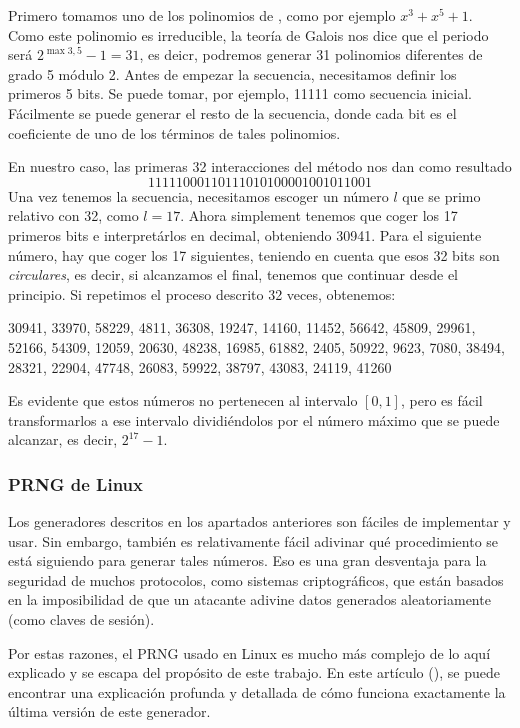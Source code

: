 \begin{example}\label{example:lfsrg}
Primero tomamos uno de los polinomios de \cite{zierler1969}, como por ejemplo $x^3+x^5+1$. Como este polinomio es irreducible, la teoría de Galois nos dice que el periodo será $2^{\max3,5}-1=31$, es deicr, podremos generar 31 polinomios diferentes de grado 5 módulo 2. Antes de empezar la secuencia, necesitamos definir los primeros 5 bits. Se puede tomar, por ejemplo, 11111 como secuencia inicial. Fácilmente se puede generar el resto de la secuencia, donde cada bit es el coeficiente de uno de los términos de tales polinomios. 

En nuestro caso, las primeras 32 interacciones del método nos dan como resultado
\[
11111000110111010100001001011001
\]
Una vez tenemos la secuencia, necesitamos escoger un número $l$ que se primo relativo con 32, como $l=17$. Ahora simplement tenemos que coger los 17 primeros bits e interpretárlos en decimal, obteniendo 30941. Para el siguiente número, hay que coger los 17 siguientes, teniendo en cuenta que esos 32 bits son \textit{circulares}, es decir, si alcanzamos el final, tenemos que continuar desde el principio. Si repetimos el proceso descrito 32 veces, obtenemos:
\begin{center}
30941, 33970, 58229, 4811, 36308, 19247, 14160, 11452, 56642, 45809, 29961, 52166, 54309, 12059, 20630, 48238, 16985, 61882, 2405, 50922, 9623, 7080, 38494, 28321, 22904, 47748, 26083, 59922, 38797, 43083, 24119, 41260
\end{center}
Es evidente que estos números no pertenecen al intervalo $[0,1]$, pero es fácil transformarlos a ese intervalo dividiéndolos por el número máximo que se puede alcanzar, es decir, $2^{17}-1$.
\end{example}

\subsubsection{PRNG de Linux}

Los generadores descritos en los apartados anteriores son fáciles de implementar y usar. Sin embargo, también es relativamente fácil adivinar qué procedimiento se está siguiendo para generar tales números. Eso es una gran desventaja para la seguridad de muchos protocolos, como sistemas criptográficos, que están basados en la imposibilidad de que un atacante adivine datos generados aleatoriamente (como claves de sesión).

Por estas razones, el PRNG usado en Linux es mucho más complejo de lo aquí explicado y se escapa del propósito de este trabajo. En este artículo (\cite{lacharme2012}), se puede encontrar una explicación profunda y detallada de cómo funciona exactamente la última versión de este generador.

